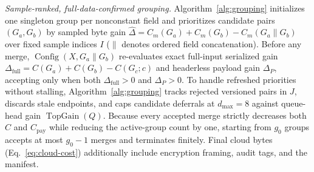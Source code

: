 \documentclass[10pt,journal]{IEEEtran}
\begin{document}
\emph{Sample-ranked, full-data-confirmed grouping.}
Algorithm~\ref{alg:grouping} initializes one singleton group per nonconstant field and prioritizes candidate pairs $(G_a,G_b)$ by sampled byte gain $\widehat\Delta=C_m(G_a)+C_m(G_b)-C_m(G_a\mathbin{\|}G_b)$ over fixed sample indices $I$ ($\|$ denotes ordered field concatenation). Before any merge, $\operatorname{Config}(X,G_a\mathbin{\|}G_b)$ re-evaluates exact full-input serialized gain $\Delta_{\mathrm{full}}=C(G_a)+C(G_b)-C(G_c;c)$ and headerless payload gain $\Delta_P$, accepting only when both $\Delta_{\mathrm{full}}>0$ and $\Delta_P>0$. To handle refreshed priorities without stalling, Algorithm~\ref{alg:grouping} tracks rejected versioned pairs in $J$, discards stale endpoints, and caps candidate deferrals at $d_{\max}=8$ against queue-head gain $\operatorname{TopGain}(Q)$. Because every accepted merge strictly decreases both $C$ and $C_{\mathrm{pay}}$ while reducing the active-group count by one, starting from $g_0$ groups accepts at most $g_0-1$ merges and terminates finitely. Final cloud bytes (Eq.~\eqref{eq:cloud-cost}) additionally include encryption framing, audit tags, and the manifest.
\end{document}
